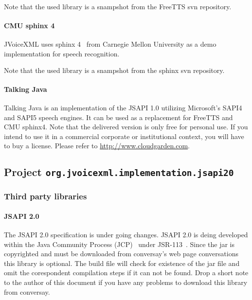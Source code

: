 \documentclass[11pt,a4paper]{article}
\begin{document}
Note that the used library is a snampshot from the FreeTTS svn repository.

\paragraph{CMU sphinx 4}
\label{sec:sphinx}

JVoiceXML uses sphinx 4~\cite{sphinx} from Carnegie Mellon University
as a demo implementation for speech recognition.

Note that the used library is a snampshot from the sphinx svn repository.

\paragraph{Talking Java}

Talking Java is an implementation of the JSAPI 1.0 utilizing Microsoft's
SAPI4 and SAPI5 speech engines. It can be used as a replacement for FreeTTS
and CMU sphinx4. Note that the delivered version is only free for personal use.
If you intend to use it in a commercial corporate or institutional context, you
will have to buy a license. Please refer to \url{http://www.cloudgarden.com}.

\subsection{Project \lstinline{org.jvoicexml.implementation.jsapi20}}

\subsubsection{Third party libraries}
\label{sec:jsapi20-third-party-libr}

\paragraph{JSAPI 2.0}

The JSAPI 2.0 specification is under going changes.
JSAPI 2.0 is deing developed within
the Java Community Process (JCP)~\cite{jcp} under 
JSR-113~\cite{jcp:jsr113}. Since the jar is copyrighted and must be downloaded
from conversay's web page conversations~\cite{conversay:jsr113}
this library is optional. The
build file will check for existence of the jar file and omit the corespondent 
compilation steps if it can not be found. Drop a short note to the author of
this document if you have any problems to download this library from conversay.
\end{document}
